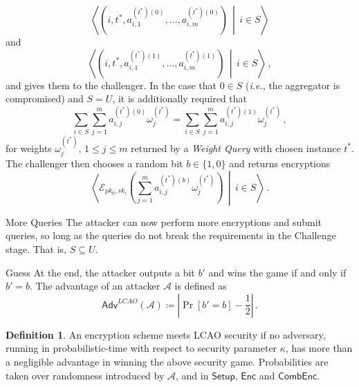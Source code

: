 \documentclass[10pt,letterpaper,oneside,twocolumn,journal]{IEEEtran}
\theoremstyle{definition}
\newtheorem{definition}{Definition}[section]
\theoremstyle{definition}
\theoremstyle{remark}
\begin{document}
\begin{LaTeXdescription}
    \begin{equation*}
        \left\langle\left(i,t^*,a^{(t^*)(0)}_{i,1},\dots,a^{(t^*)(0)}_{i,m}\right)\,\middle|\,i \in S\right\rangle
    \end{equation*}
    and
    \begin{equation*}
        \left\langle\left(i,t^*,a^{(t^*)(1)}_{i,1},\dots,a^{(t^*)(1)}_{i,m}\right)\,\middle|\, i \in S\right\rangle\,,
    \end{equation*}
    and gives them to the challenger. In the case that $0 \in S$ (\textit{i.e.}, the aggregator is compromised) and $S = U$, it is additionally required that
    \begin{equation*}
        \sum_{i\in S}\sum^{m}_{j=1} a^{(t^*)(0)}_{i,j}\omega^{(t^*)}_j = \sum_{i \in S}\sum^{m}_{j=1} a^{(t^*)(1)}_{i,j}\omega^{(t^*)}_j\,,
    \end{equation*}
    for weights $\omega^{(t^*)}_j,\,1\leq j \leq m$ returned by a \textit{Weight Query} with chosen instance $t^*$. The challenger then chooses a random bit $b \in \{1,0\}$ and returns encryptions 
    \begin{equation*}
        \left\langle\mathcal{E}_{pk_0,sk_i}\left(\sum^m_{j=1}a^{(t^*)(b)}_{i,j}\omega^{(t^*)}_j\right)\,\middle|\,i\in S\right\rangle\,.
    \end{equation*}
    \item[More Queries] The attacker can now perform more encryptions and submit queries, so long as the queries do not break the requirements in the Challenge stage. That is, $S \subseteq U$.
    \item[Guess] At the end, the attacker outputs a bit $b'$ and wins the game if and only if $b' = b$. The advantage of an attacker $\mathcal{A}$ is defined as
    \begin{equation*}
        \mathsf{Adv}^{LCAO}(\mathcal{A}) \coloneqq \left\lvert \Pr [b'=b] - \frac{1}{2}\right\rvert\,.
    \end{equation*} 
\end{LaTeXdescription}

\begin{definition}
    An encryption scheme meets LCAO security if no adversary, running in probabilistic-time with respect to security parameter $\kappa$, has more than a negligible advantage in winning the above security game. Probabilities are taken over randomness introduced by $\mathcal{A}$, and in $\mathsf{Setup}$, $\mathsf{Enc}$ and $\mathsf{CombEnc}$.
\end{definition}
\end{document}
